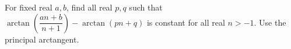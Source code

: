 For fixed real $a,b$, find all real $p,q$ such that $\arctan\left(\dfrac{an+b}{n+1}\right)-\arctan(pn+q)$ is constant for all real $n>-1$. Use the principal arctangent.
